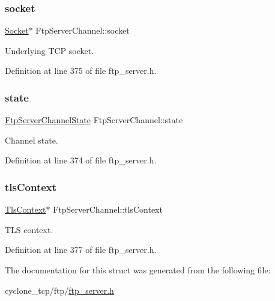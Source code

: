 \subsubsection{\texorpdfstring{socket}{socket}}
{\footnotesize\ttfamily \hyperlink{socket_8h_aa85acfb0fa336ef495e6ba87fb88fc48}{Socket}$\ast$ Ftp\+Server\+Channel\+::socket}



Underlying T\+CP socket. 



Definition at line 375 of file ftp\+\_\+server.\+h.

\mbox{\label{structFtpServerChannel_adee73abc9ffd2c821a30eef99efa9485}} 
\subsubsection{\texorpdfstring{state}{state}}
{\footnotesize\ttfamily \hyperlink{ftp__server_8h_a925bb5abc66ff43f81be2420bd31156b}{Ftp\+Server\+Channel\+State} Ftp\+Server\+Channel\+::state}



Channel state. 



Definition at line 374 of file ftp\+\_\+server.\+h.

\mbox{\label{structFtpServerChannel_a065c9bc8a17772c4aaf652689a8a6d3a}} 
\subsubsection{\texorpdfstring{tls\+Context}{tlsContext}}
{\footnotesize\ttfamily \hyperlink{tls_8h_ac09f7a286c0cdf9b07ee1edd107946f5}{Tls\+Context}$\ast$ Ftp\+Server\+Channel\+::tls\+Context}



T\+LS context. 



Definition at line 377 of file ftp\+\_\+server.\+h.



The documentation for this struct was generated from the following file\+:\begin{DoxyCompactItemize}
\item 
cyclone\+\_\+tcp/ftp/\hyperlink{ftp__server_8h}{ftp\+\_\+server.\+h}\end{DoxyCompactItemize}
